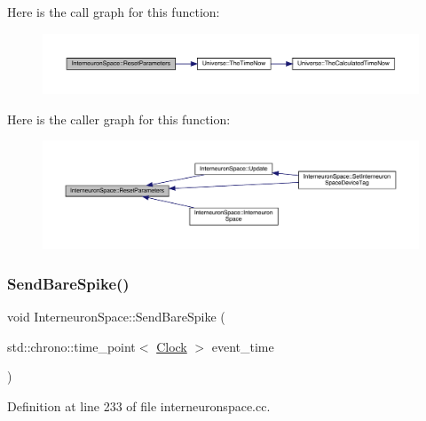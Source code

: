 Here is the call graph for this function\+:\nopagebreak
\begin{figure}[H]
\begin{center}
\leavevmode
\includegraphics[width=350pt]{class_interneuron_space_a3a9776e4a77b87374204468ca7974157_cgraph}
\end{center}
\end{figure}
Here is the caller graph for this function\+:
\nopagebreak
\begin{figure}[H]
\begin{center}
\leavevmode
\includegraphics[width=350pt]{class_interneuron_space_a3a9776e4a77b87374204468ca7974157_icgraph}
\end{center}
\end{figure}
\mbox{\label{class_interneuron_space_ab56b0336c9e53f7b448e9d35e617e8c0}} 
\subsubsection{\texorpdfstring{Send\+Bare\+Spike()}{SendBareSpike()}}
{\footnotesize\ttfamily void Interneuron\+Space\+::\+Send\+Bare\+Spike (\begin{DoxyParamCaption}\item[{std\+::chrono\+::time\+\_\+point$<$ \hyperlink{universe_8h_a0ef8d951d1ca5ab3cfaf7ab4c7a6fd80}{Clock} $>$}]{event\+\_\+time }\end{DoxyParamCaption})}



Definition at line 233 of file interneuronspace.\+cc.

